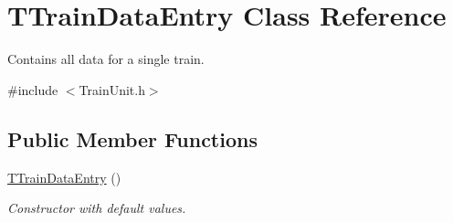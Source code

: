 \hypertarget{class_t_train_data_entry}{}\section{T\+Train\+Data\+Entry Class Reference}
\label{class_t_train_data_entry}


Contains all data for a single train.  




{\ttfamily \#include $<$Train\+Unit.\+h$>$}

\subsection*{Public Member Functions}
\begin{DoxyCompactItemize}
\item 
\mbox{\label{class_t_train_data_entry_a9e3a221ec9be3d20ee37c6c4d001ffa4}} 
\mbox{\hyperlink{class_t_train_data_entry_a9e3a221ec9be3d20ee37c6c4d001ffa4}{T\+Train\+Data\+Entry}} ()
\begin{DoxyCompactList}\small\item\em Constructor with default values. \end{DoxyCompactList}\end{DoxyCompactItemize}
